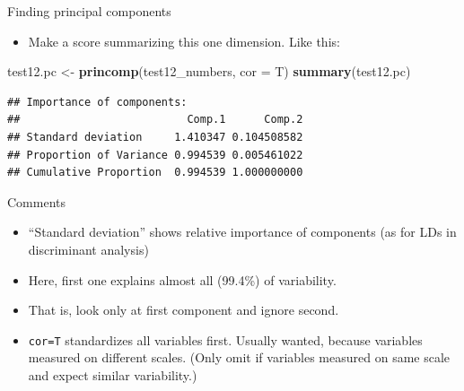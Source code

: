 \documentclass[ignorenonframetext,]{beamer}
\newenvironment{Shaded}{\begin{snugshade}}{\end{snugshade}}
\newcommand{\DataTypeTok}[1]{\textcolor[rgb]{0.13,0.29,0.53}{#1}}
\newcommand{\KeywordTok}[1]{\textcolor[rgb]{0.13,0.29,0.53}{\textbf{#1}}}
\newcommand{\NormalTok}[1]{#1}
\newcommand{\StringTok}[1]{\textcolor[rgb]{0.31,0.60,0.02}{#1}}
\providecommand{\tightlist}{%
  \setlength{\itemsep}{0pt}\setlength{\parskip}{0pt}}
\begin{document}
\begin{frame}[fragile]{Finding principal components}
\protect\hypertarget{finding-principal-components}{}

\begin{itemize}
\tightlist
\item
  Make a score summarizing this one dimension. Like this:
\end{itemize}

\begin{Shaded}
\begin{Highlighting}[]
\NormalTok{test12.pc <-}\StringTok{ }\KeywordTok{princomp}\NormalTok{(test12_numbers, }\DataTypeTok{cor =}\NormalTok{ T)}
\KeywordTok{summary}\NormalTok{(test12.pc)}
\end{Highlighting}
\end{Shaded}

\begin{verbatim}
## Importance of components:
##                          Comp.1      Comp.2
## Standard deviation     1.410347 0.104508582
## Proportion of Variance 0.994539 0.005461022
## Cumulative Proportion  0.994539 1.000000000
\end{verbatim}

\end{frame}

\begin{frame}[fragile]{Comments}
\protect\hypertarget{comments-31}{}

\begin{itemize}
\item
  ``Standard deviation'' shows relative importance of components (as for
  LDs in discriminant analysis)
\item
  Here, first one explains almost all (99.4\%) of variability.
\item
  That is, look only at first component and ignore second.
\item
  \texttt{cor=T} standardizes all variables first. Usually wanted,
  because variables measured on different scales. (Only omit if
  variables measured on same scale and expect similar variability.)
\end{itemize}

\end{frame}
\end{document}
